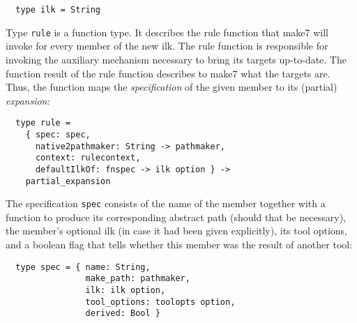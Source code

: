 \begin{verbatim}
  type ilk = String
\end{verbatim}

Type {\tt rule} is a function type.  It describes the rule function
that make7 will invoke for every member of the new ilk. The rule
function is responsible for invoking the auxiliary mechanism necessary
to bring its targets up-to-date.  The function result of the rule
function describes to make7 what the targets are.  Thus, the function
maps the {\em specification} of the given member to its (partial) {\em
expansion}:

\begin{verbatim}
  type rule =
    { spec: spec,
      native2pathmaker: String -> pathmaker,
      context: rulecontext,
      defaultIlkOf: fnspec -> ilk option } ->
    partial_expansion
\end{verbatim}

The specification {\tt spec} consists of the name of the member
together with a function to produce its corresponding abstract
path (should that be necessary), the member's optional ilk (in case
it had been given explicitly), its tool options, and a boolean flag
that tells whether this member was the result of another tool:

\begin{verbatim}
  type spec = { name: String,
                make_path: pathmaker,
                ilk: ilk option,
                tool_options: toolopts option,
                derived: Bool }
\end{verbatim}

